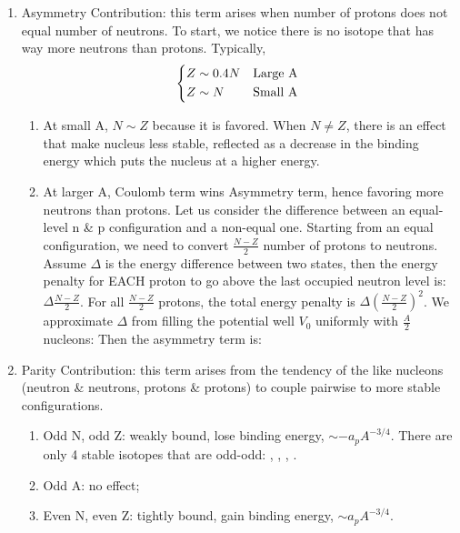 \documentclass{school-22.101-notes}
\begin{document}
\begin{enumerate}
    \item Asymmetry Contribution: this term arises when number of protons does not equal number of neutrons. To start, we notice there is no isotope that has way more neutrons than protons. Typically, 
    \begin{align}
    \begin{dcases*}
    Z \sim 0.4 N & Large A \\
    Z \sim N & Small A
    \end{dcases*}
    \end{align}
    \begin{enumerate}
    \item At small A, $N \sim Z$ because it is favored. When $N \neq Z$, there is an effect that make nucleus less stable, reflected as a decrease in the binding energy which puts the nucleus at a higher energy. 
    \item At larger A, Coulomb term wins Asymmetry term, hence favoring more neutrons than protons. Let us consider the difference between an equal-level n \& p configuration and a non-equal one. Starting from an equal configuration, we need to convert $\frac{N-Z}{2}$ number of protons to neutrons. Assume $\Delta$ is the energy difference between two states, then the energy penalty for EACH proton to go above the last occupied neutron level is: $\Delta \frac{N-Z}{2}$. For all $\frac{N-Z}{2}$ protons, the total energy penalty is $\Delta \left( \frac{N-Z}{2} \right)^2$. We approximate $\Delta$ from filling the potential well $V_0$ uniformly with $\frac{A}{2}$ nucleons: 
    Then the asymmetry term is:
    \end{enumerate}

    \item Parity Contribution: this term arises from the tendency of the like nucleons (neutron \& neutrons, protons \& protons) to couple pairwise to more stable configurations.
    \begin{enumerate}
    \item Odd N, odd Z: weakly bound, lose binding energy, $\sim -a_p A^{-3/4}$. There are only 4 stable isotopes that are odd-odd: , ,  , . 
    \item Odd A: no effect;
    \item Even N, even Z: tightly bound, gain binding energy, $\sim a_p A^{-3/4}$.
    \end{enumerate}


\end{enumerate}
\end{document}
